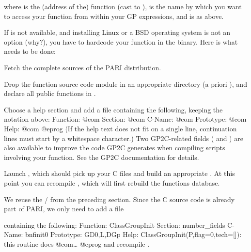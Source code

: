 
\noindent where  is the (address of the) function (cast to
),  is the name by which you want to access your
function from within your GP expressions, and  is as above.



If  is not available, and installing Linux or a BSD operating
system is not an option (why?), you have to hardcode your function in the
 binary. Here is what needs to be done:

\item Fetch the complete sources of the PARI distribution.

\item Drop the function source code module in an appropriate directory
(a priori ), and declare all public functions
in .

\item Choose a help section and add a file
containing the following, keeping the notation above:
\bprog
Function:  @com
Section:   @com
C-Name:    @com
Prototype: @com
Help:      @com
@eprog\noindent
(If the help text does not fit on a single line, continuation lines must
start by a whitespace character.) Two GP2C-related fields (
and ) are also available to improve the code GP2C generates when
compiling scripts involving your function. See the GP2C documentation for
details.

\item Launch , which should pick up your C files and build an
appropriate . At this point you can recompile , which
will first rebuild the functions database.

 We reuse the  / 
from the preceding section. Since the C source code is already part
of PARI, we only need to add a file


\noindent containing the following:
\bprog
Function: ClassGroupInit
Section: number_fields
C-Name: bnfinit0
Prototype: GD0,L,DGp
Help: ClassGroupInit(P,{flag=0},{tech=[]}): this routine does @com\dots
@eprog\noindent
and recompile .

